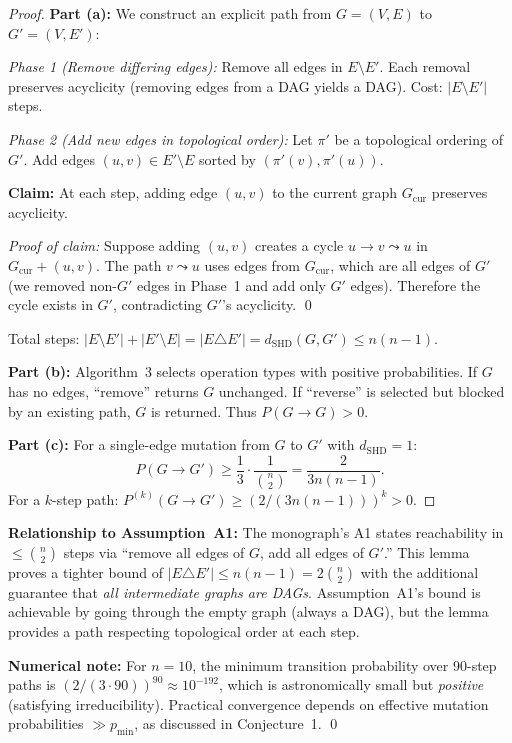 \documentclass{article}
\theoremstyle{definition}
\theoremstyle{plain}
\theoremstyle{remark}
\DeclareMathOperator{\SHD}{SHD}
\begin{document}
\begin{proof}
\textbf{Part (a):} We construct an explicit path from $G = (V, E)$ to $G' = (V, E')$:

\emph{Phase 1 (Remove differing edges):} Remove all edges in $E \setminus E'$. Each
removal preserves acyclicity (removing edges from a DAG yields a DAG). Cost: $|E \setminus E'|$ steps.

\emph{Phase 2 (Add new edges in topological order):} Let $\pi'$ be a topological
ordering of $G'$. Add edges $(u, v) \in E' \setminus E$ sorted by $(\pi'(v), \pi'(u))$.

\textbf{Claim:} At each step, adding edge $(u, v)$ to the current graph $G_{\text{cur}}$
preserves acyclicity.

\emph{Proof of claim:} Suppose adding $(u, v)$ creates a cycle $u \to v \leadsto u$
in $G_{\text{cur}} + (u, v)$. The path $v \leadsto u$ uses edges from $G_{\text{cur}}$,
which are all edges of $G'$ (we removed non-$G'$ edges in Phase~1 and add only
$G'$ edges). Therefore the cycle exists in $G'$, contradicting $G'$'s acyclicity. \qed

Total steps: $|E \setminus E'| + |E' \setminus E| = |E \triangle E'| = d_{\SHD}(G, G') \leq n(n-1)$.

\textbf{Part (b):} Algorithm~3 selects operation types with positive probabilities.
If $G$ has no edges, ``remove'' returns $G$ unchanged. If ``reverse'' is selected
but blocked by an existing path, $G$ is returned. Thus $P(G \to G) > 0$.

\textbf{Part (c):} For a single-edge mutation from $G$ to $G'$ with $d_{\SHD} = 1$:
\begin{equation}
P(G \to G') \geq \frac{1}{3} \cdot \frac{1}{\binom{n}{2}} = \frac{2}{3n(n-1)}.
\end{equation}
For a $k$-step path: $P^{(k)}(G \to G') \geq (2/(3n(n-1)))^k > 0$.
\end{proof}

\textbf{Relationship to Assumption~A1:} The monograph's A1 states reachability in
$\leq \binom{n}{2}$ steps via ``remove all edges of $G$, add all edges of $G'$.''
This lemma proves a tighter bound of $|E \triangle E'| \leq n(n-1) = 2\binom{n}{2}$
with the additional guarantee that \emph{all intermediate graphs are DAGs}.
Assumption~A1's bound is achievable by going through the empty graph (always a DAG),
but the lemma provides a path respecting topological order at each step.

\textbf{Numerical note:} For $n = 10$, the minimum transition probability over
90-step paths is $(2/(3 \cdot 90))^{90} \approx 10^{-192}$, which is astronomically
small but \emph{positive} (satisfying irreducibility). Practical convergence
depends on effective mutation probabilities $\gg p_{\min}$, as discussed in
Conjecture~1. \qed
\end{document}
